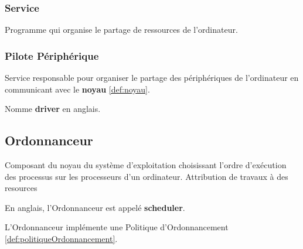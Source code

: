 \documentclass{article}
\begin{document}
\subsubsection{Service}
\begin{definition}\label{def:service}
    Programme qui organise le partage de ressources de l'ordinateur.
\end{definition}

\subsubsection{Pilote Périphérique}
\begin{definition}\label{def:pilotePeripherique}
    Service responsable pour organiser le partage des périphériques de l'ordinateur en communicant avec le \textbf{noyau} \ref{def:noyau}.
    
    \begin{remark}
        Nomme \textbf{driver} en anglais.
    \end{remark}
\end{definition}


\subsection{Ordonnanceur}
\begin{definition}\label{def:ordonnanceur}
    Composant du noyau du système d'exploitation choisissant l'ordre d'exécution des processus sur les processeurs d'un ordinateur. Attribution de travaux à des resources
    
    \begin{remark}
        En anglais, l'Ordonnanceur est appelé \textbf{scheduler}.
    \end{remark}
    L'Ordonnanceur implémente une Politique d'Ordonnancement \ref{def:politiqueOrdonnancement}.
\end{definition}
\end{document}
